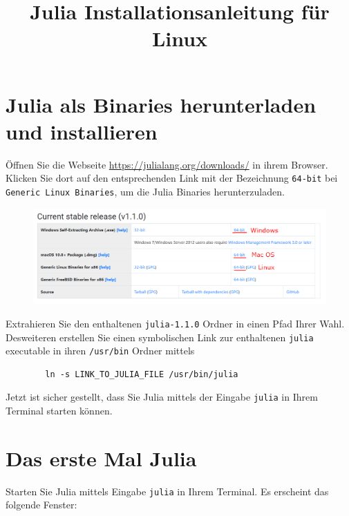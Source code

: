 \documentclass[11pt, a4paper]{scrartcl}
\title{Julia Installationsanleitung für Linux}
\author{}
\date{}
\begin{document}
	\maketitle
	
	
	
	
	
	
	\section{Julia als Binaries herunterladen und installieren}
	Öffnen Sie die Webseite \url{https://julialang.org/downloads/} in ihrem Browser. Klicken Sie dort auf den entsprechenden Link mit der Bezeichnung \texttt{64-bit} bei \texttt{Generic Linux Binaries}, um die Julia Binaries herunterzuladen.
	
	\begin{figure}[h!]
		\centering
		\includegraphics[width=\textwidth]{imgs/download.png}
	\end{figure}

	Extrahieren Sie den enthaltenen \texttt{julia-1.1.0} Ordner in einen Pfad Ihrer Wahl. Desweiteren erstellen Sie einen symbolischen Link zur enthaltenen \texttt{julia} executable in ihren \texttt{/usr/bin} Ordner mittels
	
	\begin{lstlisting}
		ln -s LINK_TO_JULIA_FILE /usr/bin/julia 
	\end{lstlisting}
	
	
	Jetzt ist sicher gestellt, dass Sie Julia mittels der Eingabe \texttt{julia} in Ihrem Terminal starten können.
	
	
	
	
	
	
	
	
	
	
	
	
	
	
	\newpage
	\section{Das erste Mal Julia}
	Starten Sie Julia mittels Eingabe \texttt{julia} in Ihrem Terminal. Es erscheint das folgende Fenster:
	
\end{document}
